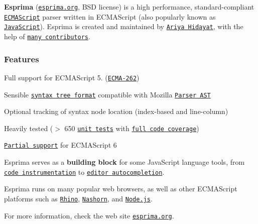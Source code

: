 {\bfseries Esprima} (\href{http://esprima.org}{\tt esprima.\+org}, B\+S\+D license) is a high performance, standard-\/compliant \href{http://www.ecma-international.org/publications/standards/Ecma-262.htm}{\tt E\+C\+M\+A\+Script} parser written in E\+C\+M\+A\+Script (also popularly known as \href{http://en.wikipedia.org/wiki/JavaScript>JavaScript}{\tt Java\+Script}). Esprima is created and maintained by \href{http://twitter.com/ariyahidayat}{\tt Ariya Hidayat}, with the help of \href{https://github.com/ariya/esprima/contributors}{\tt many contributors}.

\subsubsection*{Features}


\begin{DoxyItemize}
\item Full support for E\+C\+M\+A\+Script 5. (\href{http://www.ecma-international.org/publications/standards/Ecma-262.htm}{\tt E\+C\+M\+A-\/262})
\item Sensible \href{http://esprima.org/doc/index.html#ast}{\tt syntax tree format} compatible with Mozilla \href{https://developer.mozilla.org/en/SpiderMonkey/Parser_API}{\tt Parser A\+S\+T}
\item Optional tracking of syntax node location (index-\/based and line-\/column)
\item Heavily tested ($>$ 650 \href{http://esprima.org/test/}{\tt unit tests} with \href{http://esprima.org/test/coverage.html}{\tt full code coverage})
\item \href{http://esprima.org/doc/es6.html}{\tt Partial support} for E\+C\+M\+A\+Script 6
\end{DoxyItemize}

Esprima serves as a {\bfseries building block} for some Java\+Script language tools, from \href{http://esprima.org/demo/functiontrace.html}{\tt code instrumentation} to \href{http://esprima.org/demo/autocomplete.html}{\tt editor autocompletion}.

Esprima runs on many popular web browsers, as well as other E\+C\+M\+A\+Script platforms such as \href{http://www.mozilla.org/rhino}{\tt Rhino}, \href{http://openjdk.java.net/projects/nashorn/}{\tt Nashorn}, and \href{https://npmjs.org/package/esprima}{\tt Node.\+js}.

For more information, check the web site \href{http://esprima.org}{\tt esprima.\+org}. 